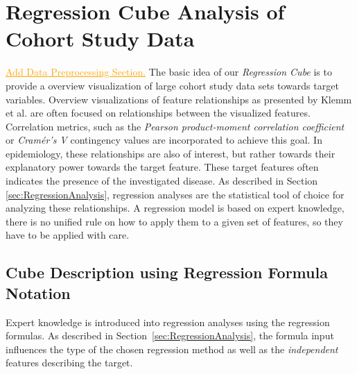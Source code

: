 \documentclass[journal]{style/vgtc} 			          %
\newcommand{\com}[1]{\textcolor{orange}{\uline{#1}}}
\begin{document}
\section{Regression Cube Analysis of Cohort Study Data}
\com{Add Data Preprocessing Section.}
The basic idea of our \emph{Regression Cube} is to provide a overview visualization of large cohort study data sets towards target variables.
Overview visualizations of feature relationships as presented by Klemm et al. \cite{Klemm2014VIS} are often focused on relationships between the visualized features.
Correlation metrics, such as the \emph{Pearson product-moment correlation coefficient} or \emph{Cram\'{e}r's V} contingency values are incorporated to achieve this goal.
In epidemiology, these relationships are also of interest, but rather towards their explanatory power towards the target feature.
These target features often indicates the presence of the investigated disease.
As described in Section \ref{sec:RegressionAnalysis}, regression analyses are the statistical tool of choice for analyzing these relationships.
A regression model is based on expert knowledge, there is no unified rule on how to apply them to a given set of features, so they have to be applied with care.
\subsection{Cube Description using Regression Formula Notation}
Expert knowledge is introduced into regression analyses using the regression formulas.
As described in Section~\ref{sec:RegressionAnalysis}, the formula input influences the type of the chosen regression method as well as the \emph{independent} features describing the target.
\end{document}
